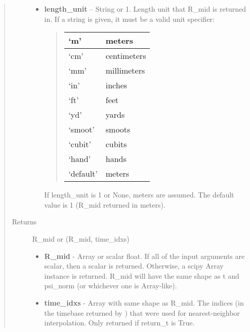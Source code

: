 \documentclass[letterpaper,10pt,english]{sphinxmanual}
\begin{document}
\begin{fulllineitems}
\begin{fulllineitems}
\begin{quote}
\begin{description}
\begin{itemize}
\item {} 
\textbf{length\_unit} --
String or 1. Length unit that R\_mid is returned in. If
a string is given, it must be a valid unit specifier:
\begin{quote}

\begin{tabulary}{\linewidth}{|L|L|}
\hline

`m'
 & 
meters
\\\hline

`cm'
 & 
centimeters
\\\hline

`mm'
 & 
millimeters
\\\hline

`in'
 & 
inches
\\\hline

`ft'
 & 
feet
\\\hline

`yd'
 & 
yards
\\\hline

`smoot'
 & 
smoots
\\\hline

`cubit'
 & 
cubits
\\\hline

`hand'
 & 
hands
\\\hline

`default'
 & 
meters
\\\hline
\end{tabulary}

\end{quote}

If length\_unit is 1 or None, meters are assumed. The default
value is 1 (R\_mid returned in meters).

\end{itemize}

\item[{Returns}] \leavevmode

R\_mid or (R\_mid, time\_idxs)
\begin{itemize}
\item {} 
\textbf{R\_mid} - Array or scalar float. If all of the input arguments are
scalar, then a scalar is returned. Otherwise, a scipy Array
instance is returned. R\_mid will have the same shape as t and
psi\_norm (or whichever one is Array-like).

\item {} 
\textbf{time\_idxs} - Array with same shape as R\_mid. The indices (in
the timebase returned by {\hyperref[eqtools:eqtools.core.Equilibrium.getTimeBase]{}}) that were used
for nearest-neighbor interpolation. Only returned if return\_t is
True.


\end{itemize}
\end{description}
\end{quote}
\end{fulllineitems}
\end{fulllineitems}
\end{document}
